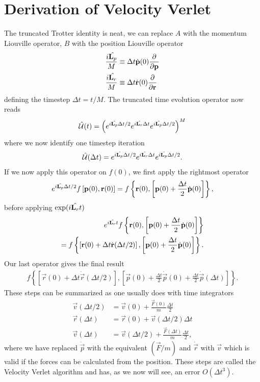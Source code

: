 \section{Derivation of Velocity Verlet}
The truncated Trotter identity is neat, we can replace $A$ with the momentum Liouville operator, $B$ with the position Liouville operator
\begin{align}
	\frac{i\hat{\mathbf L_p}}{M} &\equiv \Delta t\dot{\mathbf p}(0)\frac{\partial}{\partial \mathbf p}\\
	\frac{i\hat{\mathbf L_r}}{M} &\equiv \Delta t\dot{\mathbf r}(0)\frac{\partial}{\partial \mathbf r}
\end{align}
defining the timestep $\Delta t = t/M$. The truncated time evolution operator now reads
\begin{align}
	\hat {\mathcal U} (t) = \left(e^{i\hat{\mathbf L_p} \Delta t/2}e^{i\hat{\mathbf L_r} \Delta t}e^{i\hat{\mathbf L_p} \Delta t/2}\right)^M
\end{align}
where we now identify one timestep iteration
\begin{align}
	\hat {\mathcal U} (\Delta t) = e^{i\hat{\mathbf L_p} \Delta t/2}e^{i\hat{\mathbf L_r} \Delta t}e^{i\hat{\mathbf L_p} \Delta t/2}.
\end{align}
If we now apply this operator on $f(0)$, we first apply the rightmost operator
\begin{align}
	e^{i\hat{\mathbf L_p} \Delta t/2}f\left[\mathbf p(0), \mathbf r(0)\right] = f\left\{\mathbf r(0), \left[\mathbf p(0) + \frac{\Delta t}{2}\dot{\mathbf p}(0)\right] \right\},
\end{align}
before applying $\exp(i\hat{\mathbf L_r} t)$
\begin{align}
	e^{i\hat{\mathbf L_r} t}f\left\{\mathbf r(0), \left[\mathbf p(0) + \frac{\Delta t}{2}\dot{\mathbf p}(0)\right] \right\}\\
	= f\left\{\left[\mathbf r(0) + \Delta t \dot{\mathbf r}(\Delta t/2)\right], \left[\mathbf p(0) + \frac{\Delta t}{2}\dot{\mathbf p}(0)\right] \right\}.
\end{align}
Our last operator gives the final result
\begin{align}
	f\left\{\left[\vec r(0) + \Delta t \dot{\vec r}(\Delta t/2)\right], \left[\vec p(0) + \frac{\Delta t}{2}\dot{\vec p}(0) + \frac{\Delta t}{2}\dot{\vec p}(\Delta t)\right] \right\}.
\end{align}
These steps can be summarized as one usually does with time integrators
\begin{align}
	\vec v(\Delta t/2) &= \vec v(0) + \frac{\vec F(0)}{m}\frac{\Delta t}{2}\\
	\vec r(\Delta t) &= \vec r(0) + \vec v(\Delta t/2)\Delta t\\
	\vec v(\Delta t) &= \vec v(\Delta t/2) + \frac{\vec F(\Delta t)}{m}\frac{\Delta t}{2},
\end{align}
where we have replaced $\dot{\vec p}$ with the equivalent $(\vec F/m)$ and $\dot{\vec r}$ with $\vec v$ which is valid if the forces can be calculated from the position. These steps are called the Velocity Verlet algorithm and has, as we now will see, an error $O(\Delta t^3)$.

